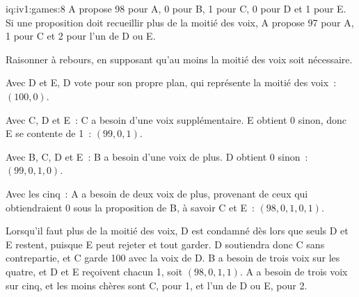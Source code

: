 \begin{solution}{iq:iv1:games:8}
A propose 98 pour A, 0 pour B, 1 pour C, 0 pour D et 1 pour E. Si une proposition doit recueillir plus de la moitié des voix, A propose 97 pour A, 1 pour C et 2 pour l'un de D ou E.

Raisonner à rebours, en supposant qu'au moins la moitié des voix soit nécessaire.

Avec D et E, D vote pour son propre plan, qui représente la moitié des voix~: $(100, 0)$.

Avec C, D et E~: C a besoin d'une voix supplémentaire. E obtient 0 sinon, donc E se contente de 1~: $(99, 0, 1)$.

Avec B, C, D et E~: B a besoin d'une voix de plus. D obtient 0 sinon~: $(99, 0, 1, 0)$.

Avec les cinq~: A a besoin de deux voix de plus, provenant de ceux qui obtiendraient 0 sous la proposition de B, à savoir C et E~: $(98, 0, 1, 0, 1)$.

Lorsqu'il faut plus de la moitié des voix, D est condamné dès lors que seuls D et E restent, puisque E peut rejeter et tout garder. D soutiendra donc C sans contrepartie, et C garde 100 avec la voix de D. B a besoin de trois voix sur les quatre, et D et E reçoivent chacun 1, soit $(98, 0, 1, 1)$. A a besoin de trois voix sur cinq, et les moins chères sont C, pour 1, et l'un de D ou E, pour 2.

\end{solution}

